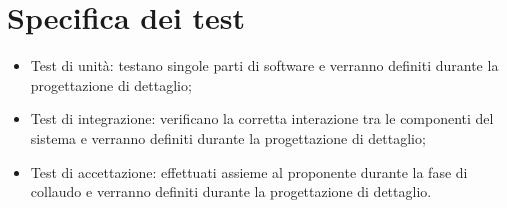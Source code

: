 \section{Specifica dei test}
\begin{itemize}
    \item Test di unità: testano singole parti di software e verranno definiti durante la progettazione di dettaglio;
    \item Test di integrazione: verificano la corretta interazione tra le componenti del sistema e verranno definiti durante la progettazione di dettaglio;
    \item Test di accettazione: effettuati assieme al proponente durante la fase di collaudo e verranno definiti durante la progettazione di dettaglio.
\end{itemize}